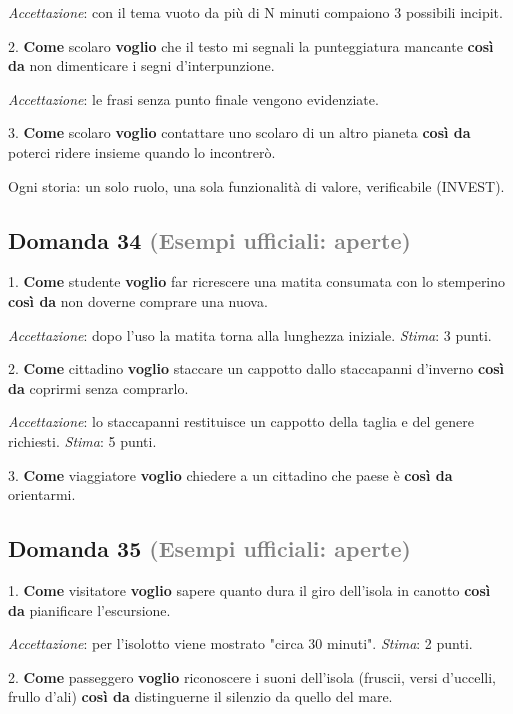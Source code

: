 \documentclass[a4paper,11pt]{article}
\begin{document}
   \textit{Accettazione}: con il tema vuoto da più di N minuti compaiono 3 possibili incipit.

2. \textbf{Come} scolaro \textbf{voglio} che il testo mi segnali la punteggiatura mancante \textbf{così da} non dimenticare i segni d'interpunzione.

   \textit{Accettazione}: le frasi senza punto finale vengono evidenziate.

3. \textbf{Come} scolaro \textbf{voglio} contattare uno scolaro di un altro pianeta \textbf{così da} poterci ridere insieme quando lo incontrerò.

Ogni storia: un solo ruolo, una sola funzionalità di valore, verificabile (INVEST).



\subsection*{Domanda 34 \hfill {\small \textcolor{gray}{(Esempi ufficiali: aperte)}}}
1. \textbf{Come} studente \textbf{voglio} far ricrescere una matita consumata con lo stemperino \textbf{così da} non doverne comprare una nuova.

   \textit{Accettazione}: dopo l'uso la matita torna alla lunghezza iniziale. \textit{Stima}: 3 punti.

2. \textbf{Come} cittadino \textbf{voglio} staccare un cappotto dallo staccapanni d'inverno \textbf{così da} coprirmi senza comprarlo.

   \textit{Accettazione}: lo staccapanni restituisce un cappotto della taglia e del genere richiesti. \textit{Stima}: 5 punti.

3. \textbf{Come} viaggiatore \textbf{voglio} chiedere a un cittadino che paese è \textbf{così da} orientarmi.



\subsection*{Domanda 35 \hfill {\small \textcolor{gray}{(Esempi ufficiali: aperte)}}}
1. \textbf{Come} visitatore \textbf{voglio} sapere quanto dura il giro dell'isola in canotto \textbf{così da} pianificare l'escursione.

   \textit{Accettazione}: per l'isolotto viene mostrato "circa 30 minuti". \textit{Stima}: 2 punti.

2. \textbf{Come} passeggero \textbf{voglio} riconoscere i suoni dell'isola (fruscii, versi d'uccelli, frullo d'ali) \textbf{così da} distinguerne il silenzio da quello del mare.
\end{document}
